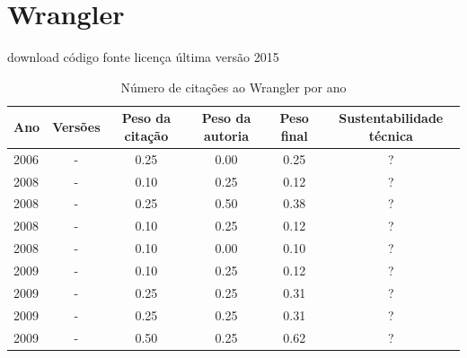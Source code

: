 \section{Wrangler}
\checkmark download
\checkmark código fonte
\checkmark licença
\checkmark última versão 2015



\begin{table}[H]
\caption{Número de citações ao Wrangler por ano}
\centering
\begin{tabular}{| l | c | c | c | c | c |}
  \hline
  Ano & Versões & Peso da citação & Peso da autoria & Peso final & Sustentabilidade técnica \\
  \hline
            2006
          &
          -
          &
          0.25
          &
          0.00
          &
            {\color{red} 0.25}
          &
          ?
          \\
\hline
            2008
          &
          -
          &
          0.10
          &
          0.25
          &
            {\color{red} 0.12}
          &
          ?
          \\
            2008
          &
          -
          &
          0.25
          &
          0.50
          &
            {\color{red} 0.38}
          &
          ?
          \\
            2008
          &
          -
          &
          0.10
          &
          0.25
          &
            {\color{red} 0.12}
          &
          ?
          \\
            2008
          &
          -
          &
          0.10
          &
          0.00
          &
            {\color{red} 0.10}
          &
          ?
          \\
\hline
            2009
          &
          -
          &
          0.10
          &
          0.25
          &
            {\color{red} 0.12}
          &
          ?
          \\
            2009
          &
          -
          &
          0.25
          &
          0.25
          &
            {\color{red} 0.31}
          &
          ?
          \\
            2009
          &
          -
          &
          0.25
          &
          0.25
          &
            {\color{red} 0.31}
          &
          ?
          \\
            2009
          &
          -
          &
          0.50
          &
          0.25
          &
            {\color{blue} 0.62}
          &
          ?

\end{tabular}
\end{table}
